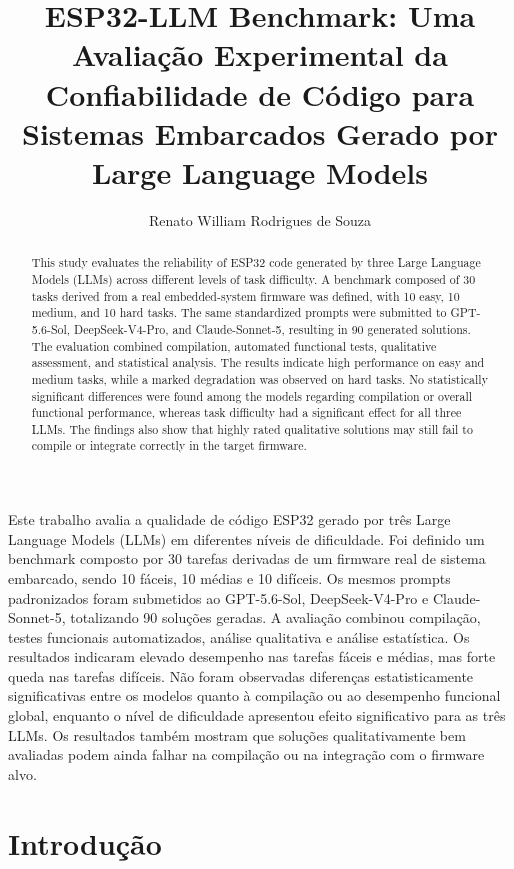 \documentclass[12pt]{article}
\title{ESP32-LLM Benchmark: Uma Avaliação Experimental da Confiabilidade de Código para Sistemas Embarcados Gerado por Large Language Models}
\author{Renato William Rodrigues de Souza\inst{1}}
\begin{document}
 

\maketitle

\begin{abstract}
This study evaluates the reliability of ESP32 code generated by three Large Language Models (LLMs) across different levels of task difficulty. A benchmark composed of 30 tasks derived from a real embedded-system firmware was defined, with 10 easy, 10 medium, and 10 hard tasks. The same standardized prompts were submitted to GPT-5.6-Sol, DeepSeek-V4-Pro, and Claude-Sonnet-5, resulting in 90 generated solutions. The evaluation combined compilation, automated functional tests, qualitative assessment, and statistical analysis. The results indicate high performance on easy and medium tasks, while a marked degradation was observed on hard tasks. No statistically significant differences were found among the models regarding compilation or overall functional performance, whereas task difficulty had a significant effect for all three LLMs. The findings also show that highly rated qualitative solutions may still fail to compile or integrate correctly in the target firmware.
\end{abstract}
     
\begin{resumo}
Este trabalho avalia a qualidade de código ESP32 gerado por três Large Language Models (LLMs) em diferentes níveis de dificuldade. Foi definido um benchmark composto por 30 tarefas derivadas de um firmware real de sistema embarcado, sendo 10 fáceis, 10 médias e 10 difíceis. Os mesmos prompts padronizados foram submetidos ao GPT-5.6-Sol, DeepSeek-V4-Pro e Claude-Sonnet-5, totalizando 90 soluções geradas. A avaliação combinou compilação, testes funcionais automatizados, análise qualitativa e análise estatística. Os resultados indicaram elevado desempenho nas tarefas fáceis e médias, mas forte queda nas tarefas difíceis. Não foram observadas diferenças estatisticamente significativas entre os modelos quanto à compilação ou ao desempenho funcional global, enquanto o nível de dificuldade apresentou efeito significativo para as três LLMs. Os resultados também mostram que soluções qualitativamente bem avaliadas podem ainda falhar na compilação ou na integração com o firmware alvo.
\end{resumo}


\section{Introdução}
\label{sec:introducao}
\end{document}
